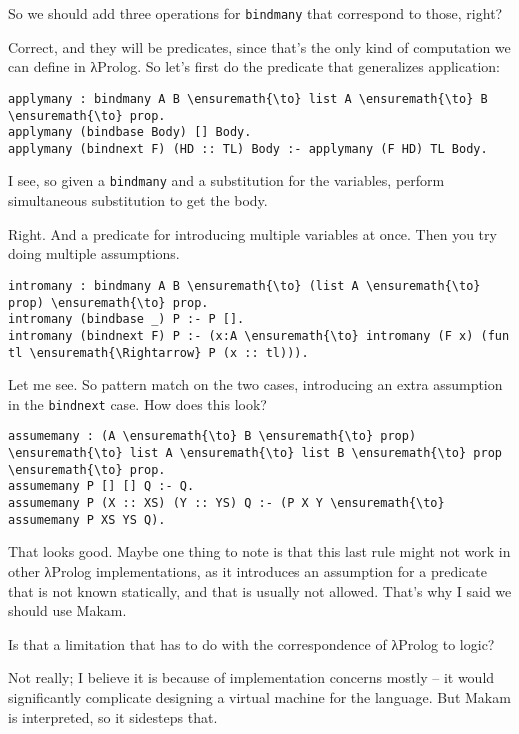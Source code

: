 \heroSTUDENT{} So we should add three operations for \texttt{bindmany} that
correspond to those, right?

\heroADVISOR{} Correct, and they will be predicates, since that's the only
kind of computation we can define in \foreignlanguage{greek}{λ}Prolog. So let's first do the
predicate that generalizes application:

\begin{verbatim}
applymany : bindmany A B \ensuremath{\to} list A \ensuremath{\to} B \ensuremath{\to} prop.
applymany (bindbase Body) [] Body.
applymany (bindnext F) (HD :: TL) Body :- applymany (F HD) TL Body.
\end{verbatim}

\heroSTUDENT{} I see, so given a \texttt{bindmany} and a substitution for the
variables, perform simultaneous substitution to get the body.

\heroADVISOR{} Right. And a predicate for introducing multiple variables at
once. Then you try doing multiple assumptions.

\begin{verbatim}
intromany : bindmany A B \ensuremath{\to} (list A \ensuremath{\to} prop) \ensuremath{\to} prop.
intromany (bindbase _) P :- P [].
intromany (bindnext F) P :- (x:A \ensuremath{\to} intromany (F x) (fun tl \ensuremath{\Rightarrow} P (x :: tl))).
\end{verbatim}

\heroSTUDENT{} Let me see. So pattern match on the two cases, introducing an
extra assumption in the \texttt{bindnext} case. How does this look?

\begin{verbatim}
assumemany : (A \ensuremath{\to} B \ensuremath{\to} prop) \ensuremath{\to} list A \ensuremath{\to} list B \ensuremath{\to} prop \ensuremath{\to} prop.
assumemany P [] [] Q :- Q.
assumemany P (X :: XS) (Y :: YS) Q :- (P X Y \ensuremath{\to} assumemany P XS YS Q).
\end{verbatim}

\heroADVISOR{} That looks good. Maybe one thing to note is that this last rule
might not work in other \foreignlanguage{greek}{λ}Prolog implementations, as it introduces an
assumption for a predicate that is not known statically, and that is
usually not allowed. That's why I said we should use Makam.

\heroSTUDENT{} Is that a limitation that has to do with the correspondence of
\foreignlanguage{greek}{λ}Prolog to logic?

\heroADVISOR{} Not really; I believe it is because of implementation concerns
mostly -- it would significantly complicate designing a virtual machine
for the language. But Makam is interpreted, so it sidesteps that.

